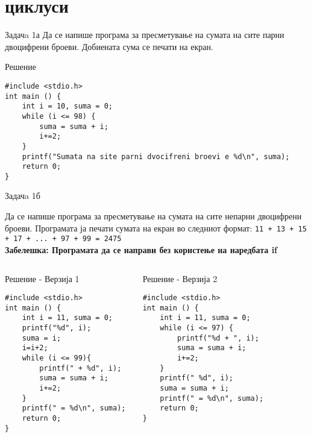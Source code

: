 \section{циклуси}
\begin{frame}[fragile]{Задачa 1а}
Да се напише програма за пресметување на сумата на сите парни двоцифрени броеви. Добиената сума се печати на екран.
\pause
\begin{exampleblock}{Решение}
    \begin{lstlisting}
#include <stdio.h> 
int main () { 
    int i = 10, suma = 0; 
    while (i <= 98) { 
        suma = suma + i; 
        i+=2; 
    } 
    printf("Sumata na site parni dvocifreni broevi e %d\n", suma); 
    return 0; 
}
\end{lstlisting}
\end{exampleblock}
\end{frame}


\begin{frame}[fragile]{Задачa 1б}
\begin{scriptsize}
Да се напише програма за пресметување на сумата на сите непарни двоцифрени броеви. Програмата ја печати сумата на екран во следниот формат: \texttt{11 + 13 + 15 + 17 + ... + 97 + 99 = 2475}\\
\textbf{Забелешка: Програмата да се направи без користење на наредбата if}
\end{scriptsize}
\pause
\begin{columns}
\begin{exampleblock}{Решение - Верзија 1}
\begin{lstlisting}
#include <stdio.h>
int main () { 
    int i = 11, suma = 0; 
    printf("%d", i); 
    suma = i; 
    i=i+2; 
    while (i <= 99){ 
        printf(" + %d", i); 
        suma = suma + i; 
        i+=2; 
    } 
    printf(" = %d\n", suma); 
    return 0; 
}
\end{lstlisting}
\end{exampleblock}
\pause
{}
\begin{exampleblock}{Решение - Верзија 2}
\begin{lstlisting}
#include <stdio.h> 
int main () { 
    int i = 11, suma = 0; 
    while (i <= 97) { 
        printf("%d + ", i); 
        suma = suma + i; 
        i+=2; 
    } 
    printf(" %d", i); 
    suma = suma + i; 
    printf(" = %d\n", suma); 
    return 0; 
} 
\end{lstlisting}
\end{exampleblock}
\end{columns}
\end{frame}

